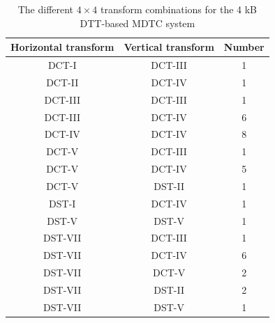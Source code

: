 \documentclass[11pt,a4paper,openright,twoside]{book}
\numberwithin{equation}{section} %
\numberwithin{figure}{section} %
\numberwithin{table}{section} %
\begin{document}
\begin{table}[tb]
	\centering
	\small
	\begin{tabular}{cc|c}
		Horizontal transform & Vertical transform & Number \\
		\hline\hline
		DCT-I   & DCT-III & 1 \\
		DCT-II  & DCT-IV  & 1 \\
		DCT-III & DCT-III & 1 \\
		DCT-III & DCT-IV  & 6 \\
		DCT-IV  & DCT-IV  & 8 \\
		DCT-V   & DCT-III & 1 \\
		DCT-V   & DCT-IV  & 5 \\
		DCT-V   & DST-II  & 1 \\
		DST-I   & DCT-IV  & 1 \\
		DST-V   & DST-V   & 1 \\
		DST-VII & DCT-III & 1 \\
		DST-VII & DCT-IV  & 6 \\
		DST-VII & DCT-V   & 2 \\
		DST-VII & DST-II  & 2 \\
		DST-VII & DST-V   & 1 \\
	\end{tabular}
	\caption{The different $4\times4$ transform combinations for the 4
	kB \acs{DTT}-based \acs{MDTC} system}
	\label{tab:dtt_combinations_4}
\end{table}
\end{document}
